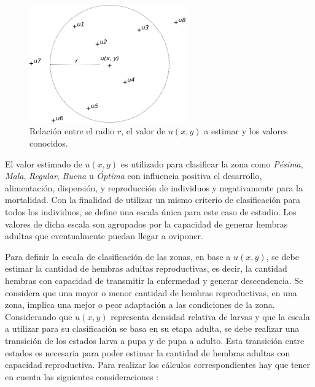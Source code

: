 \begin{figure}[!hptb]
\centering
\includegraphics[width=0.6\textwidth]{capitulo-4/graphics/zonificacion.png}
\caption{\label{fig:cap4-zonficiacion} Relación entre el radio $r$, el valor de $u(x, y)$ a estimar y los valores conocidos.}
\end{figure}

El valor estimado de $u(x,y)$ es utilizado para clasificar la zona como \textit{Pésima},
\textit{Mala}, \textit{Regular}, \textit{Buena} u \textit{Óptima} con influencia positiva el
desarrollo, alimentación, dispersión, y reproducción de individuos y negativamente para la
mortalidad. Con la finalidad de utilizar un mismo criterio de clasificación para todos los
individuos, se define una escala única para este caso de estudio. Los valores de dicha escala son
agrupados por la capacidad de generar hembras adultas que eventualmente puedan llegar a oviponer.

Para definir la escala de clasificación de las zonas, en base a $u(x, y)$, se debe estimar la
cantidad de hembras adultas reproductivas, es decir, la cantidad hembras con capacidad de
transmitir la enfermedad y generar descendencia. Se considera que una mayor o menor cantidad de
hembras reproductivas, en una zona, implica una mejor o peor adaptación a las condiciones de la
zona. Considerando que $u(x, y)$ representa densidad relativa de larvas y que la escala a utilizar
para su clasificación se basa en su etapa adulta, se debe realizar una transición de los estados
larva a pupa y de pupa a adulto. Esta transición entre estados es necesaria para poder estimar la
cantidad de hembras adultas con capacidad reproductiva. Para realizar los cálculos
correspondientes hay que tener en cuenta las siguientes consideraciones :

